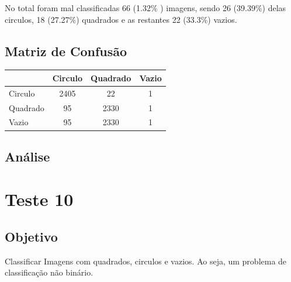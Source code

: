 No total foram mal classificadas 66 (1.32\% ) imagens, sendo 26 (39.39\%) delas circulos, 18 (27.27\%) quadrados e as restantes 22 (33.3\%) vazios. 

\subsection{Matriz de Confusão}

\begin{table}[H]
\centering
\begin{tabular}{l|c c c}
                 & Circulo & Quadrado & Vazio \\
\hline
Circulo          & 2405         & 22     & 1           \\
Quadrado         & 95           & 2330   & 1           \\
Vazio            & 95           & 2330   & 1           \\
\end{tabular}
\end{table}

\subsection{Análise}

\newpage

\section{Teste 10}
\subsection{Objetivo}
    Classificar Imagens com quadrados, circulos e vazios. Ao seja, um problema de classificação não binário.
